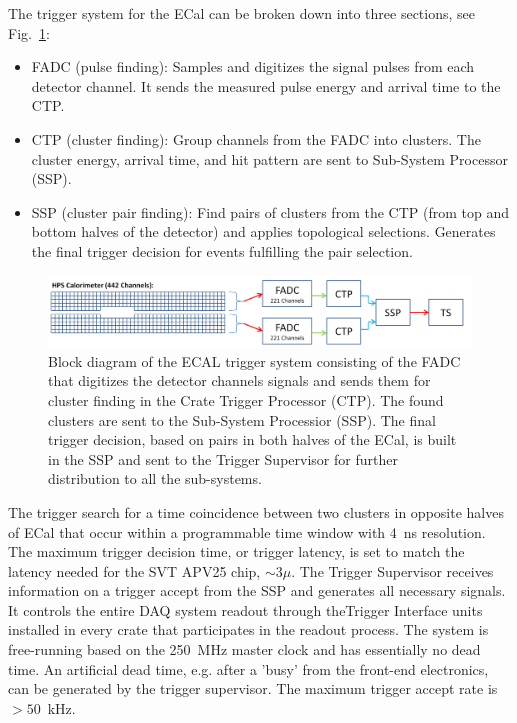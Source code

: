 The trigger system for the ECal can be broken down into three sections, see Fig.~\ref{fig:hps_trigger_cal}:
 \begin{itemize}
 \item FADC (pulse finding): Samples and digitizes the signal pulses from each detector channel. It sends the measured pulse energy and arrival time to the CTP.
 \item CTP (cluster finding): Group channels from the FADC into clusters. The cluster energy, arrival time, and hit pattern are sent to Sub-System Processor (SSP).
 \item SSP (cluster pair finding): Find pairs of clusters from the CTP (from top and bottom halves of the detector) and applies topological selections. Generates the final trigger decision for events fulfilling the pair selection.
 \end{itemize}
\begin{figure}[t]
\includegraphics[scale=0.25]{daq_trigger/figures/hps_trigger_cal}
\caption{\small{Block diagram of the ECAL trigger system consisting of the FADC that digitizes the detector channels signals and sends them for cluster finding in the Crate Trigger Processor (CTP). The found clusters are sent to the Sub-System Processior (SSP). The final trigger decision, based on pairs in both halves of the ECal, is built in the SSP and sent to the Trigger Supervisor for further distribution to all the sub-systems.}}
\label{fig:hps_trigger_cal}
\end{figure}
The trigger search for a time coincidence between two clusters in opposite halves of ECal that occur within a programmable time window with 4~ns resolution. The maximum trigger decision time, or trigger latency, is set to match the latency needed for the SVT APV25 chip, 
$\sim3\mu$. The Trigger Supervisor receives information on a trigger accept from the SSP and generates all necessary signals. It controls the entire DAQ system readout through theTrigger Interface units installed in every crate that participates in the readout process. The system is free-running based on the 250~MHz master clock and has essentially no dead time. An artificial dead time, e.g. after a 'busy' from the front-end electronics, can be generated by the trigger supervisor. The maximum trigger accept rate is $>50$~kHz.




